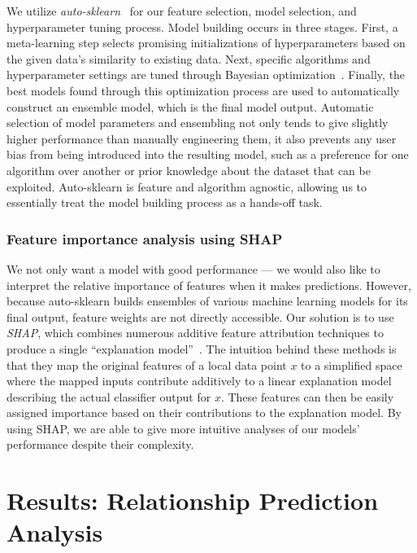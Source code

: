 \documentclass[acmlarge]{acmart}
\begin{document}
We utilize \textit{auto-sklearn}~\cite{feurer2015efficient} for our feature selection, model selection, and hyperparameter tuning process. Model building occurs in three stages. First, a meta-learning step selects promising initializations of hyperparameters based on the given data's similarity to existing data. Next, specific algorithms and hyperparameter settings are tuned through Bayesian optimization~\cite{brochu2010tutorial}. Finally, the best models found through this optimization process are used to automatically construct an ensemble model, which is the final model output. Automatic selection of model parameters and ensembling not only tends to give slightly higher performance than manually engineering them, it also prevents any user bias from being introduced into the resulting model, such as a preference for one algorithm over another or prior knowledge about the dataset that can be exploited. Auto-sklearn is feature and algorithm agnostic, allowing us to essentially treat the model building process as a hands-off task.


\subsubsection*{Feature importance analysis using SHAP}

We not only want a model with good performance --- we would also like to interpret the relative importance of features when it makes predictions. However, because auto-sklearn builds ensembles of various machine learning models for its final output, feature weights are not directly accessible. Our solution is to use \textit{SHAP}, which combines numerous additive feature attribution techniques to produce a single ``explanation model''~\cite{lundberg2017unified}. The intuition behind these methods is that they map the original features of a local data point $x$ to a simplified space where the mapped inputs contribute additively to a linear explanation model describing the actual classifier output for $x$. These features can then be easily assigned importance based on their contributions to the explanation model. By using SHAP, we are able to give more intuitive analyses of our models' performance despite their complexity.

\section{Results: Relationship Prediction Analysis}
\label{sec:rel_pred_results}
\end{document}
